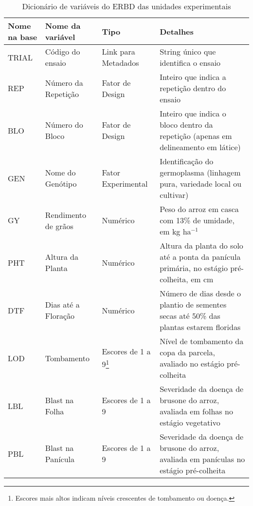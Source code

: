 
\begin{longtable}{@{} p{2.5cm} p{2.5cm} p{2.5cm} p{8.5cm} @{}} 
	\caption{Dicionário de variáveis do ERBD das unidades experimentais}
	\label{tab:dicionarioerbd2} \\
	\toprule
	\textbf{Nome na base} & \textbf{Nome da variável} & \textbf{Tipo}       & \textbf{Detalhes}                                                                         \\ \midrule
	\endfirsthead
	\endhead
	\bottomrule
	\endfoot
	\endlastfoot
	TRIAL  & Código do ensaio          & Link para Metadados & String único que identifica o ensaio                                                      \\
	REP    & Número da Repetição       & Fator de Design     & Inteiro que indica a repetição dentro do ensaio                                           \\
	BLO    & Número do Bloco           & Fator de Design     & Inteiro que indica o bloco dentro da repetição (apenas em delineamento em látice)         \\
	GEN    & Nome do Genótipo          & Fator Experimental  & Identificação do germoplasma (linhagem pura, variedade local ou cultivar)                 \\
	GY     & Rendimento de grãos       & Numérico            & Peso do arroz em casca com 13\% de umidade, em kg ha$^{-1}$                              \\
	PHT    & Altura da Planta          & Numérico            & Altura da planta do solo até a ponta da panícula primária, no estágio pré-colheita, em cm \\
	DTF    & Dias até a Floração       & Numérico            & Número de dias desde o plantio de sementes secas até 50\% das plantas estarem floridas    \\
	LOD    & Tombamento                & Escores de 1 a 9\footnote{Escores mais altos indicam níveis crescentes de tombamento ou doença.}    & Nível de tombamento da copa da parcela, avaliado no estágio pré-colheita                  \\
	LBL    & Blast na Folha            & Escores de 1 a 9    & Severidade da doença de brusone do arroz, avaliada em folhas no estágio vegetativo       \\
	PBL    & Blast na Panícula         & Escores de 1 a 9    & Severidade da doença de brusone do arroz, avaliada em panículas no estágio pré-colheita  \\

\end{longtable}
